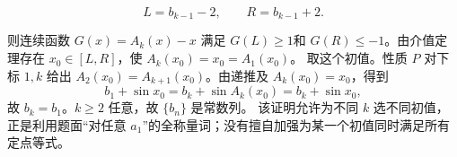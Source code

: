 \begin{answer}
\nopagebreak[4]
\[
L=b_{k-1}-2,\qquad R=b_{k-1}+2.
\]

则连续函数 \(G(x)=A_k(x)-x\) 满足 \(G(L)\ge1\)和 \(G(R)\le-1\)。由介值定理存在 \(x_0\in[L,R]\)，使 \(A_k(x_0)=x_0=A_1(x_0)\)。
取这个初值。性质 \(P\) 对下标 \(1,k\) 给出 \(A_2(x_0)=A_{k+1}(x_0)\)。由递推及 \(A_k(x_0)=x_0\)，得到
\nopagebreak[4]
\[
b_1+\sin x_0=b_k+\sin A_k(x_0)=b_k+\sin x_0,
\]
故 \(b_k=b_1\)。\(k\ge2\) 任意，故 \(\{b_n\}\) 是常数列。
该证明允许为不同 \(k\) 选不同初值，正是利用题面“对任意 \(a_1\)”的全称量词；没有擅自加强为某一个初值同时满足所有定点等式。

\enlargethispage{3\baselineskip}




\end{answer}